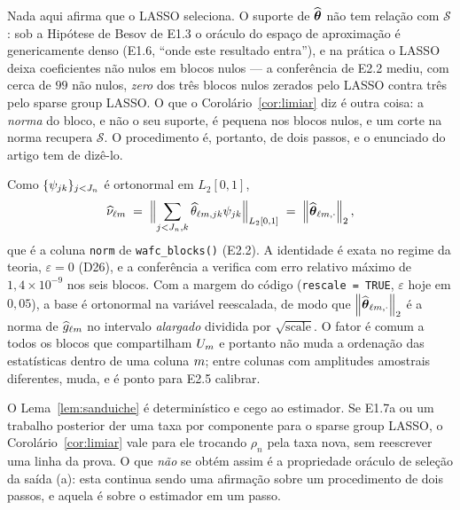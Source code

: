 \documentclass[11pt,a4paper]{article}
\newcommand{\eps}{\varepsilon}
\newcommand{\ghat}[2]{\widehat{g}_{#1#2}}
\newcommand{\Nhat}[2]{\widehat{\nu}_{#1#2}}
\newcommand{\rn}{\rho}
\begin{document}
\begin{remark}
\label{rem:nao-selecao}
Nada aqui afirma que o LASSO seleciona. O suporte de $\widehat{\boldsymbol{\theta}}$ não tem
relação com $\mathcal{S}$: sob a Hipótese de Besov de E1.3 o oráculo do espaço de
aproximação é genericamente denso (E1.6, ``onde este resultado entra''), e na
prática o LASSO deixa coeficientes não nulos em blocos nulos --- a conferência de E2.2
mediu, com cerca de $99$ não nulos, \emph{zero} dos três blocos nulos zerados
pelo LASSO contra três pelo sparse group LASSO. O que o
Corolário~\ref{cor:limiar} diz é outra coisa: a \emph{norma} do bloco, e não o
seu suporte, é pequena nos blocos nulos, e um corte na norma recupera $\mathcal{S}$. O
procedimento é, portanto, de dois passos, e o enunciado do artigo tem de
dizê-lo.
\end{remark}

\begin{remark}\label{rem:codigo}
Como $\{\psi_{jk}\}_{j<J_{n}}$ é ortonormal em $L_{2}[0,1]$,
\[
  \Nhat{\cv}{\md}
  \;=\; \Bigl\lVert \sum_{\lev<J_{n},\tsl}\widehat\theta_{\cv\md,\lev\tsl}
  \wav{\lev}{\tsl}\Bigr\rVert_{L_{2}[0,1]}
  \;=\; \norm{\thetahat_{\cv\md,\cdot}}_{2},
\]
que é a coluna \texttt{norm} de \texttt{wafc\_blocks()} (E2.2). A identidade é
exata no regime da teoria, $\eps = 0$ (D26), e a conferência a verifica com
erro relativo máximo de $1{,}4\times10^{-9}$ nos seis blocos. Com a margem do código
(\texttt{rescale = TRUE}, $\eps$ hoje em $0{,}05$), a base é ortonormal na
variável reescalada, de modo que $\left\lVert \widehat{\boldsymbol{\theta}}_{\ell m,\cdot} \right\rVert_{2}$ é a
norma de $\ghat{\cv}{\md}$ no intervalo \emph{alargado} dividida por
$\sqrt{\text{scale}}$. O fator é comum a todos os blocos que compartilham
$U_{m}$ e portanto não muda a ordenação das estatísticas dentro de uma
coluna $m$; entre colunas com amplitudes amostrais diferentes, muda, e é
ponto para E2.5 calibrar.
\end{remark}

\begin{remark}\label{rem:grupos}
O Lema~\ref{lem:sanduiche} é determinístico e cego ao estimador. Se E1.7a ou
um trabalho posterior der uma taxa por componente para o sparse group LASSO,
o Corolário~\ref{cor:limiar} vale para ele trocando $\rn_{n}$ pela taxa nova,
sem reescrever uma linha da prova. O que \emph{não} se obtém assim é a
propriedade oráculo de seleção da saída (a): esta continua sendo uma
afirmação sobre um procedimento de dois passos, e aquela é sobre o estimador
em um passo.
\end{remark}
\end{document}

